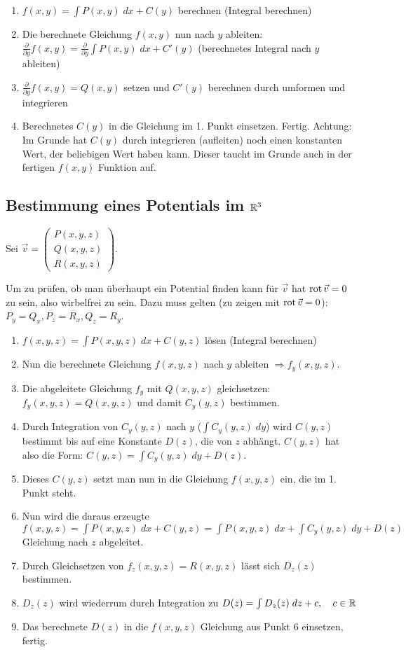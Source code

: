 \begin{enumerate}[itemsep=1em]
	\item $f(x,y) = \int P(x,y)\;dx + C(y)$ berechnen (Integral berechnen)
	\item Die berechnete Gleichung $f(x,y)$ nun nach $y$ ableiten:
	$\frac{\partial}{\partial y} f(x,y) = \frac{\partial}{\partial y}\int P(x,y)\;dx + C'(y)$
	(berechnetes Integral nach $y$ ableiten)
	\item $\frac{\partial}{\partial y} f(x,y) = Q(x,y)$ setzen und $C'(y)$ berechnen durch umformen
	und integrieren
	\item Berechnetes $C(y)$ in die Gleichung im 1. Punkt einsetzen. Fertig. Achtung: Im Grunde hat
	$C(y)$ durch integrieren (aufleiten) noch einen konstanten Wert, der beliebigen Wert haben kann.
	Dieser taucht im Grunde auch in der fertigen $f(x,y)$ Funktion auf.
\end{enumerate}

\subsection{Bestimmung eines Potentials im $\mathbb{R}^3$}
Sei $\vec{v} = \begin{pmatrix}
P(x,y,z)\\
Q(x,y,z)\\
R(x,y,z)
\end{pmatrix}$.

Um zu prüfen, ob man überhaupt ein Potential finden kann für $\vec{v}$ hat $\operatorname{rot} \vec{v} = 0$
zu sein, also wirbelfrei zu sein. Dazu muss gelten (zu zeigen mit $\operatorname{rot} \vec{v} = 0$): $P_y = Q_x, P_z = R_x, Q_z = R_y$.

\begin{enumerate}[itemsep=1em]
	\item $f(x,y,z) = \int P(x,y,z)\;dx + C(y,z)$ lösen (Integral berechnen)
	\item Nun die berechnete Gleichung $f(x,y,z)$ nach $y$ ableiten $\Rightarrow f_y(x,y,z)$.
	\item Die abgeleitete Gleichung $f_y$ mit $Q(x,y,z)$ gleichsetzen: $f_y(x,y,z) = Q(x,y,z)$
	und damit $C_y(y,z)$ bestimmen.
	\item Durch Integration von $C_y(y,z)$ nach $y$ ($\int C_y(y,z)\;dy$) wird $C(y,z)$ bestimmt
	bis auf eine Konstante $D(z)$, die von $z$ abhängt. $C(y,z)$ hat also die Form:
	$C(y,z) = \int C_y(y,z)\; dy + D(z)$.
	\item Dieses $C(y,z)$ setzt man nun in die Gleichung $f(x,y,z)$ ein, die im 1. Punkt steht.
	\item Nun wird die daraus erzeugte
	$f(x,y,z) = \int P(x,y,z)\;dx + C(y,z) = \int P(x,y,z)\;dx + \int C_y(y,z)\; dy + D(z)$
	Gleichung nach $z$ abgeleitet.
	\item Durch Gleichsetzen von $f_z(x,y,z) = R(x,y,z)$ lässt sich $D_z(z)$ bestimmen.
	\item $D_z(z)$ wird wiederrum durch Integration zu $D(z) = \int D_z(z)\; dz + c, \quad c \in \mathbb{R}$
	\item Das berechnete $D(z)$ in die $f(x,y,z)$ Gleichung aus Punkt 6 einsetzen, fertig.
\end{enumerate}

